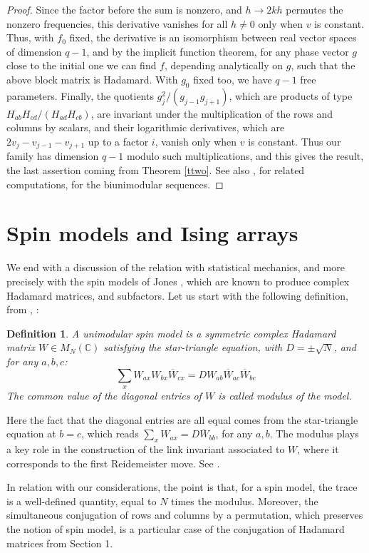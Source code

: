 \documentclass[11pt]{amsart}
\newtheorem{definition}[theorem]{Definition}
\theoremstyle{definition}
\begin{document}
\begin{proof}
Since the factor before the sum is nonzero, and $h\to2kh$ permutes the nonzero frequencies, this derivative vanishes for all $h\neq0$ only when $v$ is constant. Thus, with $f_0$ fixed, the derivative is an isomorphism between real vector spaces of dimension $q-1$, and by the implicit function theorem, for any phase vector $g$ close to the initial one we can find $f$, depending analytically on $g$, such that the above block matrix is Hadamard. With $g_0$ fixed too, we have $q-1$ free parameters. Finally, the quotients $g_j^2/(g_{j-1}g_{j+1})$, which are products of type $H_{ab}H_{cd}/(H_{ad}H_{cb})$, are invariant under the multiplication of the rows and columns by scalars, and their logarithmic derivatives, which are $2v_j-v_{j-1}-v_{j+1}$ up to a factor $i$, vanish only when $v$ is constant. Thus our family has dimension $q-1$ modulo such multiplications, and this gives the result, the last assertion coming from Theorem \ref{ttwo}. See also \cite{ben}, for related computations, for the biunimodular sequences.
\end{proof}

\section{Spin models and Ising arrays}

We end with a discussion of the relation with statistical mechanics, and more precisely with the spin models of Jones \cite{jon}, which are known to produce complex Hadamard matrices, and subfactors. Let us start with the following definition, from \cite{bb1}, \cite{jon}:

\begin{definition}
A unimodular spin model is a symmetric complex Hadamard matrix $W\in M_N(\mathbb C)$ satisfying the star-triangle equation, with $D=\pm\sqrt{N}$, and for any $a,b,c$:
$$\sum_xW_{ax}W_{bx}\overline{W}_{cx}=DW_{ab}\overline{W}_{ac}\overline{W}_{bc}$$
The common value of the diagonal entries of $W$ is called modulus of the model.
\end{definition}

Here the fact that the diagonal entries are all equal comes from the star-triangle equation at $b=c$, which reads $\sum_xW_{ax}=D\overline{W}_{bb}$, for any $a,b$. The modulus plays a key role in the construction of the link invariant associated to $W$, where it corresponds to the first Reidemeister move. See \cite{jon}.

\medskip

In relation with our considerations, the point is that, for a spin model, the trace is a well-defined quantity, equal to $N$ times the modulus. Moreover, the simultaneous conjugation of rows and columns by a permutation, which preserves the notion of spin model, is a particular case of the conjugation of Hadamard matrices from Section 1.
\end{document}
